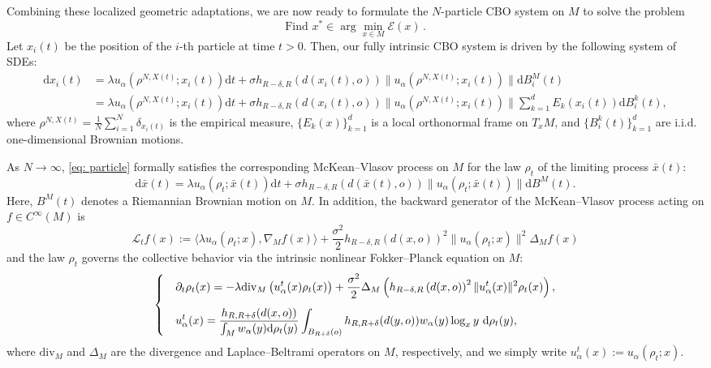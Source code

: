 \documentclass[11pt]{amsart}
\def\d{\mathrm{d}}
\newcommand{\dm}{d} %
\newcommand{\p}{o}%
\newcommand{\dist}{d}%
\begin{document}
Combining these localized geometric adaptations, we are now ready to  formulate the $N$-particle CBO system on $M$ to solve the problem
\begin{equation*}
\text{Find } x^* \in \arg\min_{x\in M} \mathcal{E}(x)\,.
\end{equation*} 
Let $x_i(t)$ be the position of the $i$-th particle at time $t>0$. Then, our fully intrinsic CBO system is driven by the following system of SDEs:
\begin{equation}\label{eq: particle}
\begin{aligned}
\d x_i(t) &=\lambda u_\alpha(\rho^{N, X(t)};x_i(t))\d t+\sigma h_{R-\delta, R}(\dist(x_i(t), \p))\|u_\alpha(\rho^{N, X(t)};x_i(t))\| \d B_i^M(t)\\
&=\lambda u_\alpha(\rho^{N, X(t)};x_i(t))\d t+\sigma h_{R-\delta, R}(\dist(x_i(t), \p))\|u_\alpha(\rho^{N, X(t)};x_i(t))\| \sum_{k=1}^\dm E_k(x_i(t))\d B_i^k(t),
\end{aligned}
\end{equation}
where $\rho^{N, X(t)}=\frac{1}{N}\sum_{i=1}^N\delta_{x_i(t)}$ is the empirical measure, $\{E_k(x)\}_{k=1}^\dm$ is a local orthonormal frame on $T_xM$, and $\{B_i^k(t)\}_{k=1}^\dm$ are i.i.d. one-dimensional Brownian motions. 

As $N \to \infty$, \eqref{eq: particle} formally satisfies  the corresponding McKean--Vlasov process on $M$ for the law $\rho_t$ of the limiting process $\bar{x}(t)$:
\begin{equation}\label{eq: Mckean}
\d \bar{x}(t)=\lambda u_\alpha(\rho_t;\bar{x}(t))\d t+\sigma h_{R-\delta, R}(\dist(\bar{x}(t), \p))\|u_\alpha(\rho_t;\bar{x}(t))\| \d B^M(t).
\end{equation}
Here, $B^M(t)$ denotes a Riemannian Brownian motion on $M$. In addition,  the backward generator of the McKean--Vlasov process acting on $f\in C^\infty(M)$ is
\begin{equation} \label{generator}
\mathcal{L}_tf(x):=\langle\lambda u_\alpha(\rho_t;x),\nabla_Mf(x)\rangle+\frac{\sigma^2}{2}h_{R-\delta, R}(\dist(x, \p))^2\|u_\alpha(\rho_t;x)\|^2\Delta_Mf(x)
\end{equation}
and the law $\rho_t$ governs the collective behavior via the intrinsic nonlinear Fokker--Planck equation on $M$:
\begin{align}\label{Main-eq}
\begin{cases}
&\displaystyle\partial_t\rho_t(x)=-\lambda\mathrm{div}_M\left(u_\alpha^t(x)\rho_t(x)\right)+\frac{\sigma^2}{2}\Delta_M\left(h_{R-\delta, R}\left(\dist(x, \p)\right)^2\|u_\alpha^t(x)\|^2\rho_t(x)\right),\vspace{0.3cm}\\
&\displaystyle  u_\alpha^t(x)=\frac{h_{R, R+\delta}(\dist(x, \p))}{\int_{M}w_\alpha(y)\d \rho_t(y)}\int_{B_{R+\delta}(\p)}h_{R, R+\delta}(\dist(y, \p))w_\alpha(y)\log_xy~\d \rho_t(y),
\end{cases}
\end{align}
where $\mathrm{div}_M$ and $\Delta_M$ are the divergence and Laplace--Beltrami operators on $M$, respectively, and we simply write $u_\alpha^t(x) := u_\alpha(\rho_t;x)$.
\end{document}
